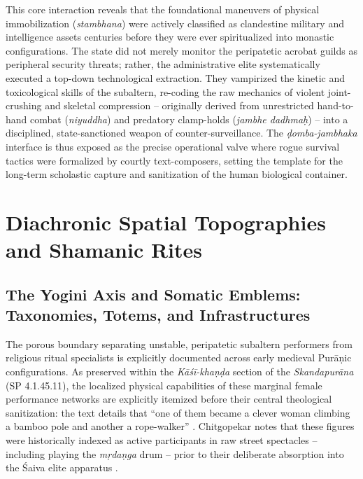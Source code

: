 \documentclass[11pt,twoside,letterpaper]{article}
\begin{document}
This core interaction reveals that the foundational maneuvers of physical immobilization (\textit{stambhana}) were actively classified as clandestine military and intelligence assets centuries before they were ever spiritualized into monastic configurations. The state did not merely monitor the peripatetic acrobat guilds as peripheral security threats; rather, the administrative elite systematically executed a top-down technological extraction. They vampirized the kinetic and toxicological skills of the subaltern, re-coding the raw mechanics of violent joint-crushing and skeletal compression – originally derived from unrestricted hand-to-hand combat (\textit{niyuddha}) and predatory clamp-holds (\textit{jambhe dadhmaḥ}) – into a disciplined, state-sanctioned weapon of counter-surveillance. The \textit{ḍomba-jambhaka} interface is thus exposed as the precise operational valve where rogue survival tactics were formalized by courtly text-composers, setting the template for the long-term scholastic capture and sanitization of the human biological container.



\section{Diachronic Spatial Topographies and Shamanic Rites}
\label{sec:diachronic_spatial_topographies}

\subsection{The Yogini Axis and Somatic Emblems: Taxonomies, Totems, and Infrastructures}

The porous boundary separating unstable, peripatetic subaltern performers from religious ritual specialists is explicitly documented across early medieval Purāṇic configurations. As preserved within the \textit{Kāśī-khaṇḍa} section of the \textit{Skandapurāna} (SP 4.1.45.11), the localized physical capabilities of these marginal female performance networks are explicitly itemized before their central theological sanitization: the text details that “one of them became a clever woman climbing a bamboo pole and another a rope-walker” \citep{Shastri1991}. Chitgopekar notes that these figures were historically indexed as active participants in raw street spectacles -- including playing the \textit{ mṛdaṇga} drum -- prior to their deliberate absorption into the Śaiva elite apparatus \citep{Chitgopekar2002}.
\end{document}
